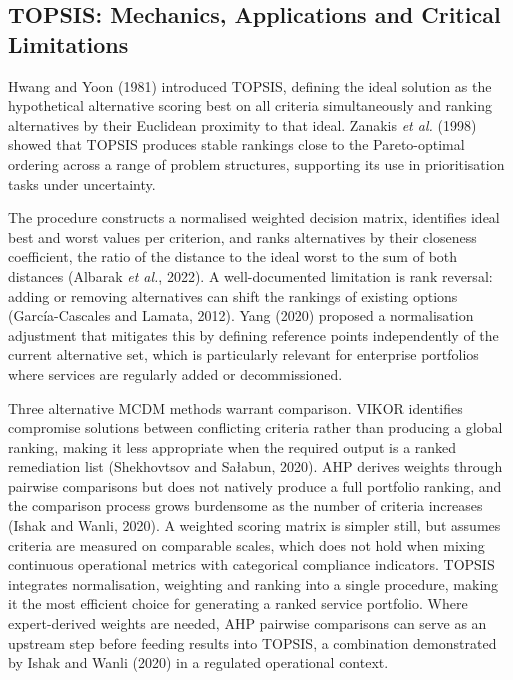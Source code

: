 \documentclass[
  12pt,
  letterpaper,
  12pt,
  oneside,
  english,
  onehalfspacing,
  headsepline]{MastersDoctoralThesis}
\begin{document}
\subsection{TOPSIS: Mechanics, Applications and Critical
Limitations}\label{topsis-mechanics-applications-and-critical-limitations}

Hwang and Yoon (1981) introduced TOPSIS, defining the ideal solution as
the hypothetical alternative scoring best on all criteria simultaneously
and ranking alternatives by their Euclidean proximity to that ideal.
Zanakis \emph{et al.} (1998) showed that TOPSIS produces stable rankings
close to the Pareto-optimal ordering across a range of problem
structures, supporting its use in prioritisation tasks under
uncertainty.

The procedure constructs a normalised weighted decision matrix,
identifies ideal best and worst values per criterion, and ranks
alternatives by their closeness coefficient, the ratio of the distance
to the ideal worst to the sum of both distances (Albarak \emph{et al.},
2022). A well-documented limitation is rank reversal: adding or removing
alternatives can shift the rankings of existing options (García-Cascales
and Lamata, 2012). Yang (2020) proposed a normalisation adjustment that
mitigates this by defining reference points independently of the current
alternative set, which is particularly relevant for enterprise
portfolios where services are regularly added or decommissioned.

Three alternative MCDM methods warrant comparison. VIKOR identifies
compromise solutions between conflicting criteria rather than producing
a global ranking, making it less appropriate when the required output is
a ranked remediation list (Shekhovtsov and Sałabun, 2020). AHP derives
weights through pairwise comparisons but does not natively produce a
full portfolio ranking, and the comparison process grows burdensome as
the number of criteria increases (Ishak and Wanli, 2020). A weighted
scoring matrix is simpler still, but assumes criteria are measured on
comparable scales, which does not hold when mixing continuous
operational metrics with categorical compliance indicators. TOPSIS
integrates normalisation, weighting and ranking into a single procedure,
making it the most efficient choice for generating a ranked service
portfolio. Where expert-derived weights are needed, AHP pairwise
comparisons can serve as an upstream step before feeding results into
TOPSIS, a combination demonstrated by Ishak and Wanli (2020) in a
regulated operational context.
\end{document}
